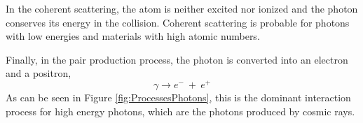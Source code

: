 In the coherent scattering, the atom is neither excited nor ionized and the photon conserves its energy in the collision. Coherent scattering is probable for photons with low energies and materials with high atomic numbers. %

Finally, in the pair production process, the photon is converted into an electron and a positron,
\begin{equation}
\gamma \longrightarrow e^- ~ + ~ e^+
\label{eq:pairproductionprocess}
\end{equation}
As can be seen in Figure \ref{fig:ProcessesPhotons}, this is the dominant interaction process for high energy photons, which are the photons produced by cosmic rays.


